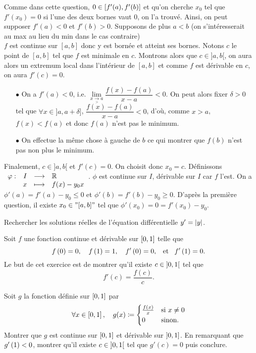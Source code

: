 \documentclass{magnolia}
\begin{document}
\begin{sol}
\begin{questions}
\question 
Comme dans cette question, $0\in \left[f'(a),f'(b)\right]$ et qu'on cherche $x_0$ tel que $f'(x_0)=0$  si l'une des deux bornes vaut $0$, on l'a trouvé. Ainsi, on peut supposer $f'(a)<0$ et $f'(b)>0$. Supposons de plus $a<b$ (on s'intéresserait au max au lieu du min dans le cas contraire)\\
$f$ est continue sur $[a,b]$ donc y est bornée et atteint ses bornes. Notons $c$ le point de $[a,b]$ tel que $f$ est minimale en $c$. Montrons alors que $c\in ]a,b[$, on aura alors un extremum local dans l'intérieur de $[a,b]$ et comme $f$ est dérivable en $c$, on aura $f'(c)=0$.\\
\begin{itemize}
\item[$\bullet$] On a $f'(a)<0$, i.e. $\underset{x\underset{>}{\to}a}{\lim}\dfrac{f(x)-f(a)}{x-a}<0$. On peut alors fixer $\delta>0$ tel que $\forall x \in ]a,a+\delta]$, $\dfrac{f(x)-f(a)}{x-a}<0$, d'où, comme $x>a$, $f(x)<f(a)$ et donc $f(a)$ n'est pas le minimum.
\item[$\bullet$] On effectue la même chose à gauche de $b$ ce qui montrer que $f(b)$ n'est pas non plus le minimum. 
\end{itemize}
Finalement, $c\in ]a,b[$ et $f'(c)=0$. On choisit donc $x_0=c$.
\question Définissons $\begin{array}[t]{lrcl} \displaystyle{\varphi} : & \displaystyle{I} & \longrightarrow & \displaystyle{\mathbb{R}} \\ & \displaystyle{x} & \longmapsto & \displaystyle{f(x)-y_0 x} \end{array}$. $\phi$ est continue sur $I$, dérivable sur $I$ car $f$ l'est. On a $\phi'(a)=f'(a)-y_0\leq 0$ et $\phi'(b)=f'(b)-y_0\geq 0$. D'après la première question, il existe $x_0 \in "[a,b]"$ tel que $\phi'(x_0)=0=f'(x_0)-y_0$.
\end{questions}

\end{sol}

Rechercher les solutions réelles de l'équation
différentielle $y'=\left|y\right|$.


Soit $f$ une fonction continue et dérivable sur $\left[0,1\right]$ telle que
\[f\left(0\right)=0, \quad f\left(1\right)=1, \quad f'\left(0\right)=0, \quad\!\text{et}\quad\! f'\left(1\right)=0.\]
Le but de cet exercice est de montrer qu'il existe $c\in\left]0,1\right[$ tel
que
\[f'(c)=\frac{f(c)}{c}.\]
\begin{questions}
\question Soit $g$ la fonction définie sur $\left[0,1\right]$ par
  \[\forall x\in\left[0,1\right] ,\quad g(x)\coloneqq
    \begin{cases}
    \frac{f(x)}{x} & \text{si $x\neq 0$}\\
    0 & \text{sinon.}
    \end{cases}\]
  Montrer que $g$ est continue sur $\left[0,1\right]$ et dérivable sur
  $\left]0,1\right]$.
\question En remarquant que $g'\left(1\right)<0$, montrer qu'il existe
  $c\in\left]0,1\right[$ tel que $g'(c)=0$ puis conclure.
\end{questions}
\end{document}
